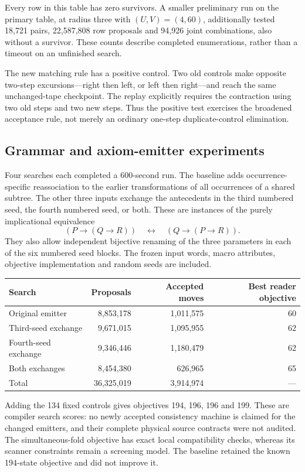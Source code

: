 Every row in this table has zero survivors. A smaller preliminary run on
the primary table, at radius three with $(U,V)=(4,60)$, additionally tested
18,721 pairs, 22,587,808 row proposals and 94,926 joint combinations, also
without a survivor. These counts describe completed enumerations, rather
than a timeout on an unfinished search.

The new matching rule has a positive control. Two old controls make
opposite two-step excursions---right then left, or left then right---and
reach the same unchanged-tape checkpoint. The replay explicitly requires
the contraction using two old steps and two new steps. Thus the positive
test exercises the broadened acceptance rule, not merely an ordinary
one-step duplicate-control elimination.

\subsection{Grammar and axiom-emitter experiments}

Four searches each completed a 600-second run. The baseline adds
occurrence-specific reassociation to the earlier transformations of all
occurrences of a shared subtree. The other three inputs exchange the
antecedents in the third numbered seed, the fourth numbered seed, or both.
These are instances of the purely implicational equivalence
\[
 (P\to(Q\to R))\quad\longleftrightarrow\quad(Q\to(P\to R)).
\]
They also allow independent bijective renaming of the three parameters in
each of the six numbered seed blocks. The frozen input words, macro
attributes, objective implementation and random seeds are included.

\begin{center}\small
\begin{tabular}{lrrr}
\hline
Search & Proposals & Accepted moves & Best reader objective\\
\hline
Original emitter & 8,853,178 & 1,011,575 & 60\\
Third-seed exchange & 9,671,015 & 1,095,955 & 62\\
Fourth-seed exchange & 9,346,446 & 1,180,479 & 62\\
Both exchanges & 8,454,380 & 626,965 & 65\\
\hline
Total & 36,325,019 & 3,914,974 & ---\\
\hline
\end{tabular}
\end{center}

Adding the 134 fixed controls gives objectives 194, 196, 196 and 199.
These are compiler search scores: no newly accepted consistency machine
is claimed for the changed emitters, and their complete physical source
contracts were not audited. The simultaneous-fold objective has exact
local compatibility checks, whereas its scanner constraints remain a
screening model. The baseline retained the known 194-state objective and
did not improve it.

